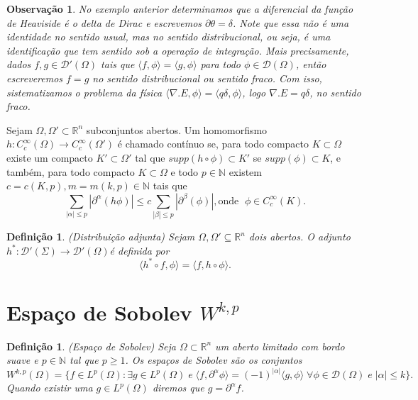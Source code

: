 \documentclass[12pt]{book}
\newtheorem{definicao}[teorema]{Definição}
\newtheorem{observacao}[teorema]{Observação}
\newcommand{\distribuicoes}{\distribuicoesgeral{\Omega}}
\newcommand{\distribuicoesgeral}[1]{\mathcal{D'}(#1)}
\newcommand{\espacoLp}[1]{L^{p}(#1)}
\newcommand{\espacoLpGeral}[2]{L^{#1}(#2)}
\newcommand{\funcoesdiferenciaveissupp}[2]{C^{#1}_{c}(#2)}
\newcommand{\funcoesteste}{\mathcal{D}(\Omega)}
\newcommand{\produtointerno}[2]{\langle #1, #2 \rangle}
\newcommand{\real}[1]{\mathbb{R}^{#1}}
\begin{document}
	\begin{observacao}
		No exemplo anterior determinamos que a diferencial da função de Heaviside é o delta de Dirac e escrevemos $\partial \theta = \delta$. Note que essa não é uma identidade no sentido usual, mas no sentido distribucional, ou seja, é uma identificação que tem sentido sob a operação de integração. Mais precisamente, dados $f,g \in \distribuicoes$ tais que $\produtointerno{f}{\phi}=\produtointerno{g}{\phi}$ para todo $\phi \in \funcoesteste$, então escreveremos $f=g$ no sentido distribucional ou sentido fraco. Com isso, sistematizamos o problema da física $\produtointerno{\nabla.E}{\phi} = \produtointerno{q\delta}{\phi}$, logo $\nabla.E = q\delta$, no sentido fraco.
	\end{observacao}
	
	Sejam $\Omega, \Omega'\subset \real{n}$ subconjuntos abertos. Um homomorfismo $h : \funcoesdiferenciaveissupp{\infty}{\Omega} \to \funcoesdiferenciaveissupp{\infty}{\Omega'}$ é chamado contínuo se, para todo compacto $K \subset \Omega$ existe um compacto $K' \subset \Omega'$ tal que $supp(h \circ \phi ) \subset K'$ se $supp(\phi) \subset K$, e também, para todo compacto $K \subset \Omega$ e todo $p \in \mathbb{N}$ existem $c = c(K,p), m = m(k,p) \in \mathbb{N}$ tais que 
	$$
	\sum_{|\alpha|\leq p}|\partial^{\alpha}(h\phi)|\leq c			\sum_{|\beta|\leq p}|\partial^{\beta}(\phi)|, \text{onde }\; \phi \in \funcoesdiferenciaveissupp{\infty}{K}.
	$$
	
	\begin{definicao}\label{definicao_distribuicao_adjunta}
		(Distribuição adjunta) Sejam $\Omega, \Omega'\subseteq \real{n}$ dois abertos. O adjunto $h^{*}: \distribuicoesgeral{\Sigma} \to \distribuicoesgeral{\Omega}$é definida por
		$$
		\produtointerno{h^{*}\circ f}{\phi} = 		\produtointerno{f}{h\circ\phi}.
		$$
	\end{definicao}\label{definicao_espalo_sobolev}
	
	\section{Espaço de Sobolev $W^{k,p}$}\label{secao_espaco_sobolev}
	\begin{definicao}\label{definicao_espaco_sobolev}
		(Espaço de Sobolev) Seja $\Omega \subset \real{n}$ um aberto limitado com bordo suave e $p \in \mathbb{N}$ tal que $p\geq 1$. Os espaços de Sobolev são os conjuntos
		$$
		W^{k,p} (\Omega)= \{ f\in \espacoLp{\Omega}: \exists g \in \espacoLp{\Omega} \; e \;\produtointerno{f}{\partial^{\alpha}\phi} = (-1)^{|\alpha|}\produtointerno{g}{\phi}\; \forall \phi \in \funcoesteste \; e\; |\alpha|\leq k\}.
		$$
		Quando existir uma $g \in \espacoLpGeral{p}{\Omega}$ diremos que $g = \partial^{\alpha}f$.
	\end{definicao}
	
\end{document}
